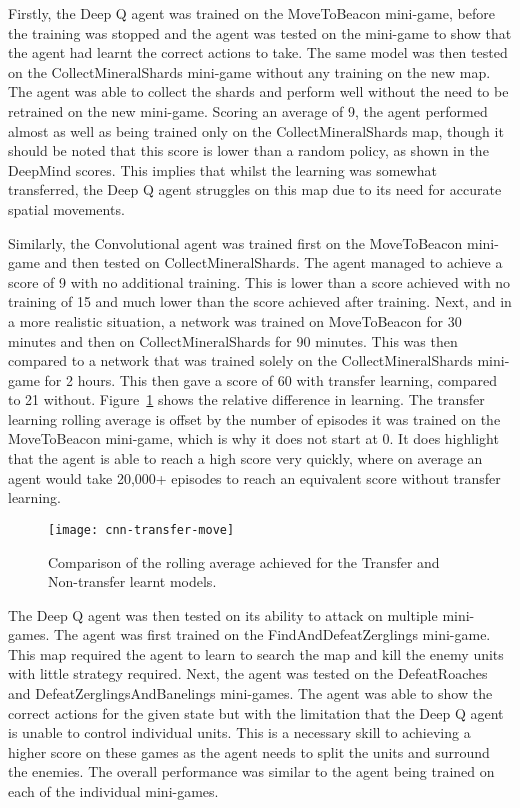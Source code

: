 Firstly, the Deep Q agent was trained on the MoveToBeacon mini-game, before the
training was stopped and the agent was tested on the mini-game to show that the
agent had learnt the correct actions to take. The same model was then tested on
the CollectMineralShards mini-game without any training on the new map. The
agent was able to collect the shards and perform well without the need to be
retrained on the new mini-game. Scoring an average of 9, the agent performed
almost as well as being trained only on the CollectMineralShards map, though it
should be noted that this score is lower than a random policy, as shown in the
DeepMind scores. This implies that whilst the learning was somewhat transferred,
the Deep Q agent struggles on this map due to its need for accurate spatial
movements.

Similarly, the Convolutional agent was trained first on the MoveToBeacon
mini-game and then tested on CollectMineralShards. The agent managed to achieve
a score of 9 with no additional training. This is lower than a score achieved
with no training of 15 and much lower than the score achieved after training.
Next, and in a more realistic situation, a network was trained on MoveToBeacon
for 30 minutes and then on CollectMineralShards for 90 minutes. This was then
compared to a network that was trained solely on the CollectMineralShards
mini-game for 2 hours. This then gave a score of 60 with transfer learning,
compared to 21 without. Figure~\ref{fig:transfer_cnn_move} shows the relative
difference in learning. The transfer learning rolling average is offset by the
number of episodes it was trained on the MoveToBeacon mini-game, which is why it
does not start at 0. It does highlight that the agent is able to reach a high
score very quickly, where on average an agent would take 20,000+ episodes to
reach an equivalent score without transfer learning.

\begin{figure}[h]
    \centering
    \texttt{[image: cnn-transfer-move]}
    \caption{Comparison of the rolling average achieved for the Transfer and
    Non-transfer learnt models.}%
    \label{fig:transfer_cnn_move}%
\end{figure}

The Deep Q agent was then tested on its ability to attack on multiple mini-games.
The agent was first trained on the FindAndDefeatZerglings mini-game. This map required
the agent to learn to search the map and kill the enemy units with little
strategy required. Next, the agent was tested on the DefeatRoaches and
DefeatZerglingsAndBanelings mini-games. The agent was able to show the correct
actions for the given state but with the limitation that the Deep Q agent is
unable to control individual units. This is a necessary skill to achieving a
higher score on these games as the agent needs to split the units and surround
the enemies. The overall performance was similar to the agent being trained on
each of the individual mini-games.

